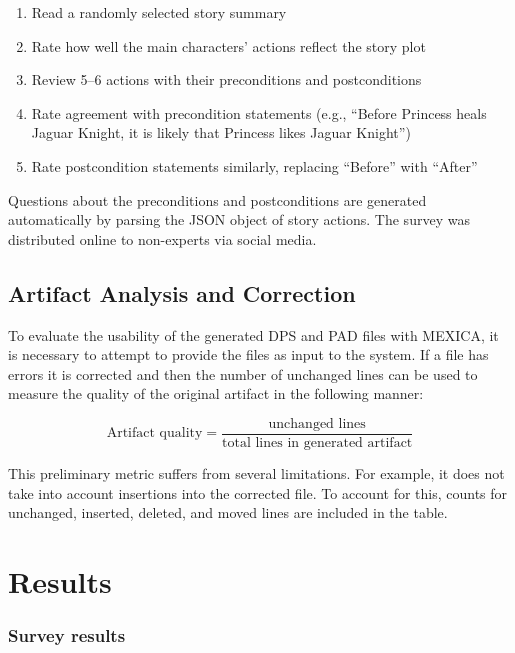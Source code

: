 \documentclass[phd,electronic,oneside,twosidetoc,letterpaper,chaptercenter,parttop,lof]{byumsphd}
\begin{document}
\begin{enumerate}
\item Read a randomly selected story summary
\item Rate how well the main characters' actions reflect the story plot
\item Review 5–6 actions with their preconditions and postconditions
\item Rate agreement with precondition statements (e.g., “Before Princess heals Jaguar Knight, it is likely that Princess likes Jaguar Knight”)
\item Rate postcondition statements similarly, replacing “Before” with “After”
\end{enumerate}

Questions about the preconditions and postconditions are generated automatically by parsing the JSON object of story actions. The survey was distributed online to non-experts via social media.


\subsection{Artifact Analysis and Correction}

To evaluate the usability of the generated DPS and PAD files with MEXICA, it is necessary to attempt to provide the files as input to the system. If a file has errors it is corrected and then the number of unchanged lines can be used to measure the quality of the original artifact in the following manner:

\begin{equation}
\textrm{Artifact quality} = \dfrac{\textrm{unchanged lines}}{ \textrm{total lines in generated artifact}}
\end{equation}

This preliminary metric suffers from several limitations. For example, it does not take into account insertions into the corrected file. To account for this, counts for unchanged, inserted, deleted, and moved lines are included in the table. 


\section{Results}

\subsubsection{Survey results}
\end{document}
